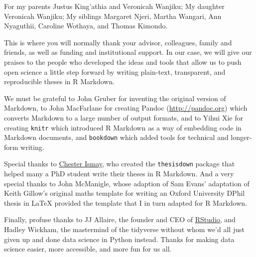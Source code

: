 \documentclass[a4paper,nobind]{templates/ociamthesis}
\begin{document}

\begin{romanpages}

\maketitle

\begin{dedication}
  For my parents Justus King'athia and Veronicah Wanjiku; My daughter Veronicah Wanjiku; My siblings Margaret Njeri, Martha Wangari, Ann Nyaguthii, Caroline Wothaya, and Thomas Kimondo.
\end{dedication}

\begin{acknowledgements}
 	This is where you will normally thank your advisor, colleagues, family and friends, as well as funding and institutional support. In our case, we will give our praises to the people who developed the ideas and tools that allow us to push open science a little step forward by writing plain-text, transparent, and reproducible theses in R Markdown.

  We must be grateful to John Gruber for inventing the original version of Markdown, to John MacFarlane for creating Pandoc (\url{http://pandoc.org}) which converts Markdown to a large number of output formats, and to Yihui Xie for creating \texttt{knitr} which introduced R Markdown as a way of embedding code in Markdown documents, and \texttt{bookdown} which added tools for technical and longer-form writing.

  Special thanks to \href{http://chester.rbind.io}{Chester Ismay}, who created the \texttt{thesisdown} package that helped many a PhD student write their theses in R Markdown. And a very special thanks to John McManigle, whose adaption of Sam Evans' adaptation of Keith Gillow's original maths template for writing an Oxford University DPhil thesis in LaTeX provided the template that I in turn adapted for R Markdown.

  Finally, profuse thanks to JJ Allaire, the founder and CEO of \href{http://rstudio.com}{RStudio}, and Hadley Wickham, the mastermind of the tidyverse without whom we'd all just given up and done data science in Python instead. Thanks for making data science easier, more accessible, and more fun for us all.


\end{acknowledgements}
\end{romanpages}
\end{document}
